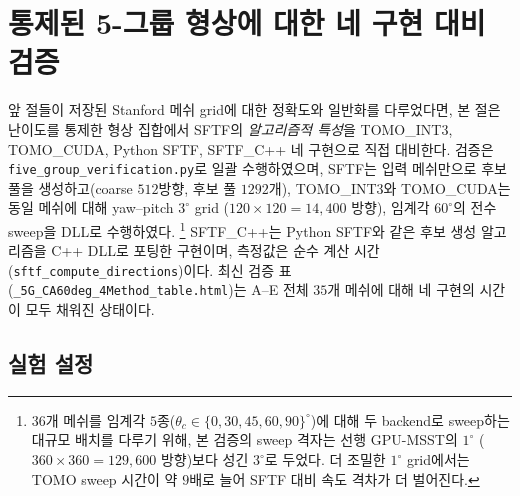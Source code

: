 \documentclass[11pt,a4paper]{article}
\begin{document}
\section{통제된 5-그룹 형상에 대한 네 구현 대비 검증}
\label{sec:fivegroup}

앞 절들이 저장된 Stanford 메쉬 grid에 대한 정확도와 일반화를 다루었다면,
본 절은 난이도를 통제한 형상 집합에서 SFTF의 \emph{알고리즘적 특성}을
TOMO\_INT3, TOMO\_CUDA, Python SFTF, SFTF\_C++ 네 구현으로 직접 대비한다.
검증은 \texttt{five\_group\_verification.py}로 일괄 수행하였으며,
SFTF는 입력 메쉬만으로 후보 풀을 생성하고(coarse $512$방향, 후보 풀 $1292$개),
TOMO\_INT3와 TOMO\_CUDA는 동일 메쉬에 대해 yaw--pitch $3^\circ$ grid
($120\times120=14{,}400$ 방향), 임계각 $60^\circ$의 전수 sweep을 DLL로 수행하였다.%
\footnote{$36$개 메쉬를 임계각 $5$종($\theta_c\in\{0,30,45,60,90\}^\circ$)에 대해 두 backend로
sweep하는 대규모 배치를 다루기 위해, 본 검증의 sweep 격자는 선행 GPU-MSST의 $1^\circ$
($360\times360=129{,}600$ 방향)보다 성긴 $3^\circ$로 두었다. 더 조밀한 $1^\circ$ grid에서는
TOMO sweep 시간이 약 $9$배로 늘어 SFTF 대비 속도 격차가 더 벌어진다.}
SFTF\_C++는 Python SFTF와 같은 후보 생성 알고리즘을 C++ DLL로 포팅한 구현이며,
측정값은 순수 계산 시간(\texttt{sftf\_compute\_directions})이다.
최신 검증 표(\texttt{\_5G\_CA60deg\_4Method\_table.html})는 A--E 전체 $35$개 메쉬에 대해
네 구현의 시간이 모두 채워진 상태이다.

\subsection{실험 설정}
\end{document}
